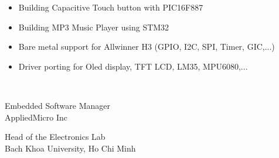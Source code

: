 \documentclass[12pt,a4paper]{altacv}
\begin{document}
\begin{itemize}
\item Building Capacitive Touch button with PIC16F887
\item Building MP3 Music Player using STM32
\item Bare metal support for Allwinner H3 (GPIO, I2C, SPI, Timer, GIC,...)
\item Driver porting for Oled display, TFT LCD, LM35, MPU6080,...
\end{itemize}



 \\

{
	Embedded Software Manager \\
	AppliedMicro Inc \\
}

\divider

{
	Head of the Electronics Lab \\
	Bach Khoa University, Ho Chi Minh \\
}
\end{document}
